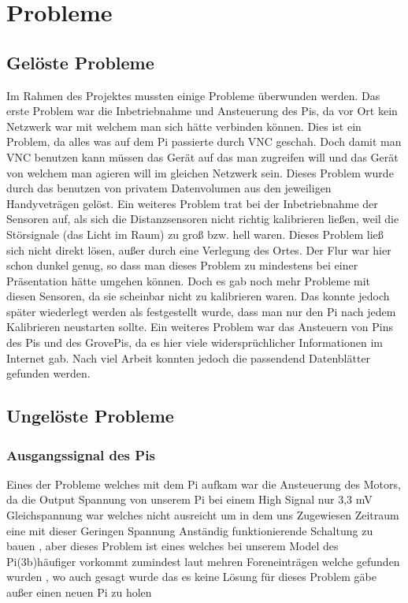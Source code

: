 \documentclass[notitlepage]{report}
\begin{document}
\section{Probleme}

\subsection{Gel\"{o}ste Probleme}

Im Rahmen des Projektes mussten einige Probleme \"{u}berwunden werden. Das erste Problem war die Inbetriebnahme und Ansteuerung des Pis, da vor Ort kein Netzwerk war mit welchem man sich h\"{a}tte verbinden k\"{o}nnen. Dies ist ein Problem, da alles was auf dem Pi passierte durch VNC geschah. Doch damit man VNC benutzen kann m\"{u}ssen das Ger\"{a}t auf das man zugreifen will und das Ger\"{a}t von welchem man agieren will im gleichen Netzwerk sein. Dieses Problem wurde durch das benutzen von privatem Datenvolumen aus den jeweiligen Handyvetr\"{a}gen gel\"{o}st. Ein weiteres Problem trat bei der Inbetriebnahme der Sensoren auf, als sich die Distanzsensoren nicht richtig kalibrieren lie{\ss}en, weil die St\"{o}rsignale (das Licht im Raum) zu gro{\ss} bzw. hell waren. Dieses Problem lie{\ss} sich nicht direkt l\"{o}sen, au{\ss}er durch eine Verlegung des Ortes. Der Flur war hier schon dunkel genug, so dass man dieses Problem zu mindestens bei einer Pr\"{a}sentation h\"{a}tte umgehen k\"{o}nnen. Doch es gab noch mehr Probleme mit diesen Sensoren, da sie scheinbar nicht zu kalibrieren waren. Das konnte jedoch sp\"{a}ter wiederlegt werden als festgestellt wurde, dass man nur den Pi nach jedem Kalibrieren neustarten sollte. Ein weiteres Problem war das Ansteuern von Pins des Pis und des GrovePis, da es hier viele widerspr\"{u}chlicher Informationen im Internet gab. Nach viel Arbeit konnten jedoch die passendend Datenbl\"{a}tter gefunden werden. 

\subsection{Ungel\"{o}ste Probleme}

\subsubsection{Ausgangssignal des Pis}

Eines der Probleme welches mit dem Pi aufkam war die Ansteuerung des Motors, da die Output Spannung von unserem Pi bei einem High Signal nur 3,3 mV Gleichspannung war welches nicht ausreicht um in dem uns Zugewiesen Zeitraum eine mit dieser Geringen Spannung Anst\"{a}ndig funktionierende Schaltung zu bauen , aber dieses Problem ist eines welches bei unserem Model des Pi(3b)h\"{a}ufiger vorkommt zumindest laut mehren Foreneintr\"{a}gen welche  gefunden wurden , wo auch gesagt wurde das es keine L\"{o}sung f\"{u}r dieses Problem g\"{a}be au{\ss}er einen neuen Pi zu holen 
\end{document}
